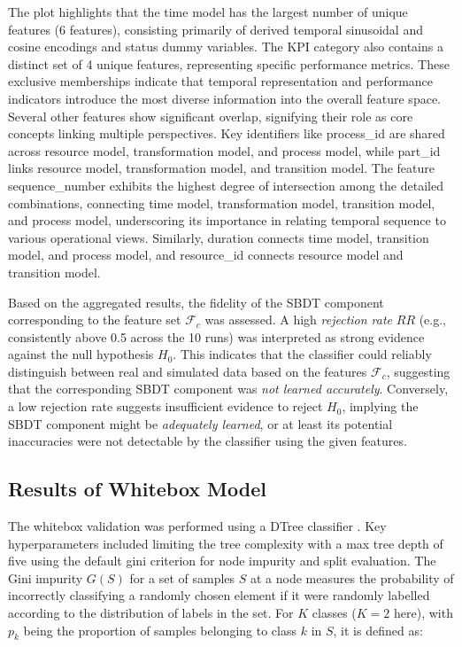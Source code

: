 The plot highlights that the time model has the largest number of unique features (6 features), consisting primarily of derived temporal sinusoidal and cosine encodings and status dummy variables. The KPI category also contains a distinct set of 4 unique features, representing specific performance metrics. These exclusive memberships indicate that temporal representation and performance indicators introduce the most diverse information into the overall feature space.
Several other features show significant overlap, signifying their role as core concepts linking multiple perspectives. Key identifiers like process\_id are shared across resource model, transformation model, and process model, while part\_id links resource model, transformation model, and transition model. The feature sequence\_number exhibits the highest degree of intersection among the detailed combinations, connecting time model, transformation model, transition model, and process model, underscoring its importance in relating temporal sequence to various operational views. Similarly, duration connects time model, transition model, and process model, and resource\_id connects resource model and transition model.

Based on the aggregated results, the fidelity of the SBDT component corresponding to the feature set $\mathcal{F}_c$ was assessed. A high \textit{rejection rate} $RR$ (e.g., consistently above 0.5 across the 10 runs) was interpreted as strong evidence against the null hypothesis $H_0$. This indicates that the classifier could reliably distinguish between real and simulated data based on the features $\mathcal{F}_c$, suggesting that the corresponding SBDT component was \textit{not learned accurately}. Conversely, a low rejection rate suggests insufficient evidence to reject $H_0$, implying the SBDT component might be \textit{adequately learned}, or at least its potential inaccuracies were not detectable by the classifier using the given features.

\subsection*{Results of Whitebox Model}
\label{sec:results-whitebox}
The whitebox validation was performed using a DTree classifier \autocite{Scikit-Learn}. Key hyperparameters included limiting the tree complexity with a max tree depth of five using the default gini criterion for node impurity and split evaluation. The Gini impurity $G(S)$ for a set of samples $S$ at a node measures the probability of incorrectly classifying a randomly chosen element if it were randomly labelled according to the distribution of labels in the set. For $K$ classes ($K = 2$ here), with $p_k$ being the proportion of samples belonging to class $k$ in $S$, it is defined as:

